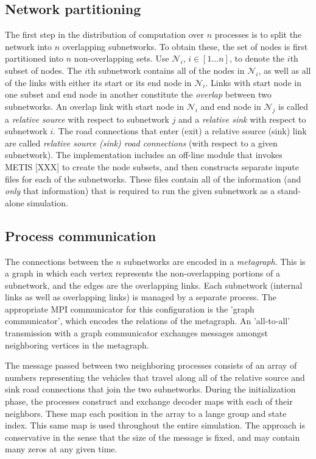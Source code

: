 \subsection{Network partitioning}

The first step in the distribution of computation over $n$ processes is to split the network into $n$ overlapping subnetworks. To obtain these, the set of nodes is first partitioned into $n$ non-overlapping sets. Use $\mathcal{N}_i$, $i\in[1\hdots n]$, to denote the $i$th subset of nodes. The $i$th subnetwork contains all of the nodes in $\mathcal{N}_i$, as well as all of the links with either its start or its end node in $\mathcal{N}_i$. 
Links with start node in one subset and end node in another constitute the \textit{overlap} between two subnetworks. An overlap link with start node in $\mathcal{N}_i$ and end node in $\mathcal{N}_j$ is called a \textit{relative source} with respect to subnetwork $j$ and a \textit{relative sink} with respect to subnetwork $i$. The road connections that enter (exit) a relative source (sink) link are called \textit{relative source (sink) road connections} (with respect to a given subnetwork). The implementation includes an off-line module that invokes METIS [XXX] to create the node subsets, and then constructs separate inpute files for each of the subnetworks. These files contain all of the information (and \textit{only} that information) that is required to run the given subnetwork as a stand-alone simulation. 

\subsection{Process communication}

The connections between the $n$ subnetworks are encoded in a \textit{metagraph}. This is a graph in which each vertex represents the non-overlapping portions of a subnetwork, and the edges are the overlapping links. Each subnetwork (internal links as well as overlapping links) is managed by a separate process. The appropriate MPI communicator for this configuration is the 'graph communicator', which encodes the relations of the metagraph. An 'all-to-all' transmission with a graph communicator exchanges messages amongst neighboring vertices in the metagraph. 

The message passed between two neighboring processes consists of an array of numbers representing the vehicles that travel along all of the relative source and sink road connections that join the two subnetworks. During the initialization phase, the processes construct and exchange decoder maps with each of their neighbors. These map each position in the array to a lange group and state index. This same map is used throughout the entire simulation. The approach is conservative in the sense that the size of the message is fixed, and may contain many zeros at any given time. 

